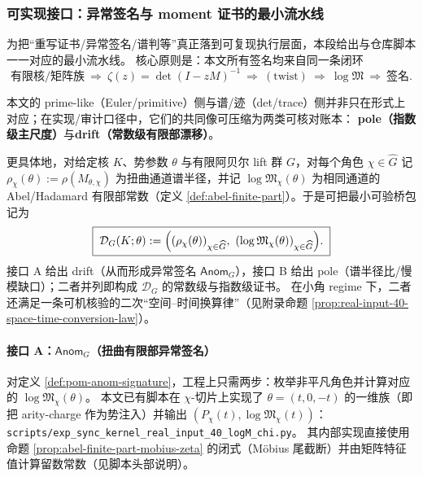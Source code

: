 \subsubsection{可实现接口：异常签名与 moment 证书的最小流水线}\label{subsec:pom-implementable-interfaces}

为把“重写证书/异常签名/谱判等”真正落到可复现执行层面，本段给出与仓库脚本一一对应的最小流水线。
核心原则是：本文所有签名均来自同一条闭环
$$
\text{有限核/矩阵族}\ \Longrightarrow\ \zeta(z)=\det(I-zM)^{-1}\ \Longrightarrow\ (\text{twist})\ \Longrightarrow\ \log\mathfrak{M}\ \Longrightarrow\ \text{签名}.
$$

\begin{remark}\label{rem:pom-pole-drift-bridgepack}
本文的 prime-like（Euler/primitive）侧与谱/迹（det/trace）侧并非只在形式上对应；在实现/审计口径中，它们的共同像可压缩为两类可核对账本：
\textbf{pole（指数级主尺度）}与\textbf{drift（常数级有限部漂移）}。
\par
更具体地，对给定核 \(K\)、势参数 \(\theta\) 与有限阿贝尔 lift 群 \(G\)，对每个角色 \(\chi\in\widehat G\) 记 \(\rho_\chi(\theta):=\rho(M_{\theta,\chi})\) 为扭曲通道谱半径，并记 \(\log\mathfrak{M}_\chi(\theta)\) 为相同通道的 Abel/Hadamard 有限部常数（定义 \ref{def:abel-finite-part}）。于是可把最小可验桥包记为
\[
\boxed{\;
\mathcal{D}_G(K;\theta):=\Bigl((\rho_\chi(\theta))_{\chi\in\widehat G},\ (\log\mathfrak{M}_\chi(\theta))_{\chi\in\widehat G}\Bigr).\;}
\]
接口 A 给出 drift（从而形成异常签名 \(\mathsf{Anom}_G\)），接口 B 给出 pole（谱半径比/慢模缺口）；二者并列即构成 \(\mathcal{D}_G\) 的常数级与指数级证书。
在小角 regime 下，二者还满足一条可机核验的二次“空间--时间换算律”（见附录命题 \ref{prop:real-input-40-space-time-conversion-law}）。
\end{remark}

\paragraph{接口 A：\texorpdfstring{$\mathsf{Anom}_G$}{Anom}（扭曲有限部异常签名）}
对定义 \ref{def:pom-anom-signature}，工程上只需两步：枚举非平凡角色并计算对应的 \(\log\mathfrak{M}_\chi(\theta)\)。
本文已有脚本在 \(\chi\)-切片上实现了 \(\theta=(t,0,-t)\) 的一维族（即把 arity-charge 作为势注入）并输出 \((P_\chi(t),\log\mathfrak{M}_\chi(t))\)：
\texttt{scripts/exp\_sync\_kernel\_real\_input\_40\_logM\_chi.py}。
其内部实现直接使用命题 \ref{prop:abel-finite-part-mobius-zeta} 的闭式（Möbius 尾截断）并由矩阵特征值计算留数常数（见脚本头部说明）。


